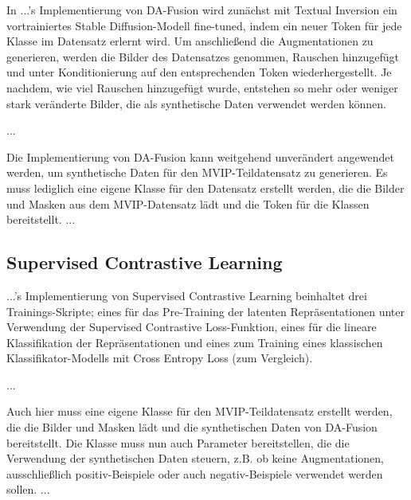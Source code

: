 
In ...'s Implementierung von DA-Fusion wird zunächst mit Textual Inversion ein vortrainiertes Stable Diffusion-Modell fine-tuned, indem ein neuer Token für jede Klasse im Datensatz erlernt wird. Um anschließend die Augmentationen zu generieren, werden die Bilder des Datensatzes genommen, Rauschen hinzugefügt und unter Konditionierung auf den entsprechenden Token wiederhergestellt. Je nachdem, wie viel Rauschen hinzugefügt wurde, entstehen so mehr oder weniger stark veränderte Bilder, die als synthetische Daten verwendet werden können.

...

Die Implementierung von DA-Fusion kann weitgehend unverändert angewendet werden, um synthetische Daten für den MVIP-Teildatensatz zu generieren. Es muss lediglich eine eigene Klasse für den Datensatz erstellt werden, die die Bilder und Masken aus dem MVIP-Datensatz lädt und die Token für die Klassen bereitstellt. ...

\subsection{Supervised Contrastive Learning} \label{sec:impl-supcon}


...'s Implementierung von Supervised Contrastive Learning beinhaltet drei Trainings-Skripte; eines für das Pre-Training der latenten Repräsentationen unter Verwendung der Supervised Contrastive Loss-Funktion, eines für die lineare Klassifikation der Repräsentationen und eines zum Training eines klassischen Klassifikator-Modells mit Cross Entropy Loss (zum Vergleich).

...

Auch hier muss eine eigene Klasse für den MVIP-Teildatensatz erstellt werden, die die Bilder und Masken lädt und die synthetischen Daten von DA-Fusion bereitstellt. Die Klasse muss nun auch Parameter bereitstellen, die die Verwendung der synthetischen Daten steuern, z.B. ob keine Augmentationen, ausschließlich positiv-Beispiele oder auch negativ-Beispiele verwendet werden sollen. ...

